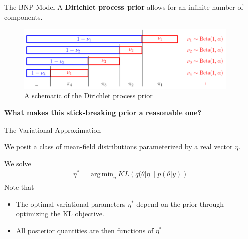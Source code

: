 \documentclass[10pt]{beamer}\usepackage[]{graphicx}\usepackage[]{color}
\DeclareMathOperator*{\argmin}{arg\,min}
\begin{document}
\begin{frame}{The BNP Model}
A {\bf Dirichlet process prior} allows for an infinite number of components. 
\vspace{-0.2in}
\begin{figure}[!h]
\centering
\includegraphics[width = 0.95\textwidth]{./figures/DP_stick_breaking.png}
\caption{A schematic of the Dirichlet process prior}
\end{figure}

\begin{mdframed}[style=MyFrame]
\begin{center}
{\bf What makes this stick-breaking prior a reasonable one?}
\end{center}
\end{mdframed}

\end{frame}

\begin{frame}{The Variational Approximation}

We posit a class of mean-field distributions parameterized by a real vector $\eta$. 

We solve
\begin{align*}
  \eta^* = \argmin_{\eta} KL\left(
      q(\theta \vert \eta \big\| p(\theta | y)
      \right)
\end{align*}
%
Note that 

\begin{itemize}
\item The optimal variational parameters $\eta^*$ depend on the prior through optimizing the KL objective. 

\item All posterior quantities are then functions of $\eta^*$

\end{itemize}

\end{frame}
\end{document}
